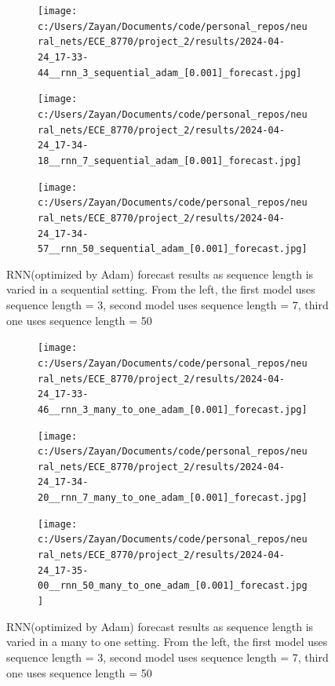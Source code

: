 \documentclass[12pt, letterpaper]{article}
\begin{document}
\begin{figure}[htpb]
    \centering
    \begin{subfigure}[b]{0.3\textwidth}
        \texttt{[image: c:/Users/Zayan/Documents/code/personal\_repos/neural\_nets/ECE\_8770/project\_2/results/2024-04-24\_17-33-44\_\_rnn\_3\_sequential\_adam\_[0.001]\_forecast.jpg]}
    \end{subfigure}
    \begin{subfigure}[b]{0.3\textwidth}
        \texttt{[image: c:/Users/Zayan/Documents/code/personal\_repos/neural\_nets/ECE\_8770/project\_2/results/2024-04-24\_17-34-18\_\_rnn\_7\_sequential\_adam\_[0.001]\_forecast.jpg]}
    \end{subfigure}
    \begin{subfigure}[b]{0.3\textwidth}
        \texttt{[image: c:/Users/Zayan/Documents/code/personal\_repos/neural\_nets/ECE\_8770/project\_2/results/2024-04-24\_17-34-57\_\_rnn\_50\_sequential\_adam\_[0.001]\_forecast.jpg]}
    \end{subfigure}
    \caption{RNN(optimized by Adam) forecast results as sequence length is varied in a sequential setting. From 
    the left, the first model uses sequence length = 3, second model uses sequence length = 7, third one uses sequence length = 50}
    \label{fig: Adam-RNN forecast results as sequence length is varied in a sequential setting}
\end{figure}

\begin{figure}[htpb]
    \centering
    \begin{subfigure}[b]{0.3\textwidth}
        \texttt{[image: c:/Users/Zayan/Documents/code/personal\_repos/neural\_nets/ECE\_8770/project\_2/results/2024-04-24\_17-33-46\_\_rnn\_3\_many\_to\_one\_adam\_[0.001]\_forecast.jpg]}
    \end{subfigure}
    \begin{subfigure}[b]{0.3\textwidth}
        \texttt{[image: c:/Users/Zayan/Documents/code/personal\_repos/neural\_nets/ECE\_8770/project\_2/results/2024-04-24\_17-34-20\_\_rnn\_7\_many\_to\_one\_adam\_[0.001]\_forecast.jpg]}
    \end{subfigure}
    \begin{subfigure}[b]{0.3\textwidth}
        \texttt{[image: c:/Users/Zayan/Documents/code/personal\_repos/neural\_nets/ECE\_8770/project\_2/results/2024-04-24\_17-35-00\_\_rnn\_50\_many\_to\_one\_adam\_[0.001]\_forecast.jpg]}
    \end{subfigure}
    \caption{RNN(optimized by Adam) forecast results as sequence length is varied in a many to one setting. From 
    the left, the first model uses sequence length = 3, second model uses sequence length = 7, third one uses sequence length = 50}
    \label{fig: Adam-RNN forecast results as sequence length is varied in a many-to-one setting}
\end{figure}
\end{document}
